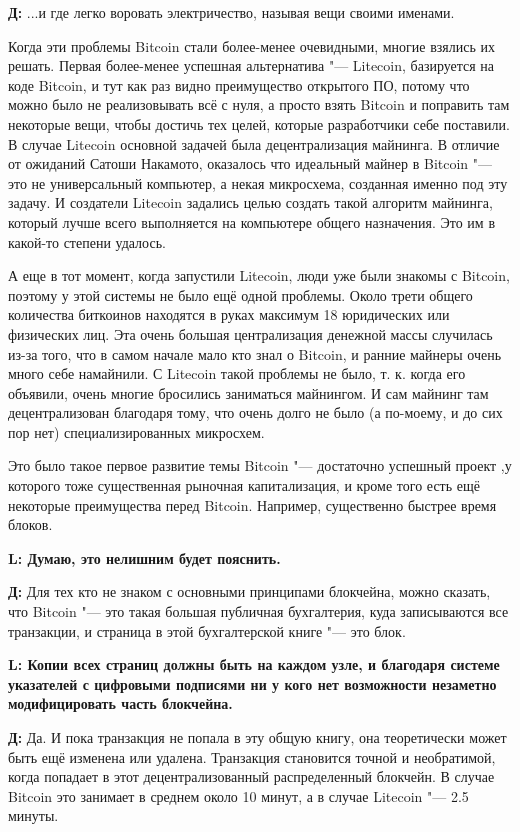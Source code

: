 \documentclass[10pt, a5paper]{article}
\begin{document}
{\noindent \bf Д:} ...и где легко воровать электричество, называя вещи своими именами.

Когда эти проблемы Bitcoin стали более-менее очевидными, многие взялись их решать. Первая более-менее успешная альтернатива "--- Litecoin, базируется на коде Bitcoin, и тут как раз видно преимущество открытого ПО, потому что можно было не реализовывать всё с нуля, а просто взять Bitcoin и поправить там некоторые вещи, чтобы достичь тех целей, которые разработчики себе поставили. В случае Litecoin основной задачей была децентрализация майнинга. В отличие от ожиданий Сатоши Накамото, оказалось что идеальный майнер в Bitcoin "--- это не универсальный компьютер, а некая микросхема, созданная именно под эту задачу. И создатели Litecoin задались целью создать такой алгоритм майнинга, который лучше всего выполняется на компьютере общего назначения. Это им в какой-то степени удалось. 

А еще в тот момент, когда запустили Litecoin, люди уже были знакомы с Bitcoin, поэтому у этой системы не было ещё одной проблемы. Около трети общего количества биткоинов находятся в руках максимум 18 юридических или физических лиц. Эта очень большая централизация денежной массы случилась из-за того, что в самом начале мало кто знал о Bitcoin, и ранние майнеры очень много себе намайнили. С Litecoin такой проблемы не было, т. к. когда его объявили, очень многие бросились заниматься майнингом. И сам майнинг там децентрализован благодаря тому, что очень долго не было (а по-моему, и до сих пор нет) специализированных микросхем. 

Это было такое первое развитие темы Bitcoin "--- достаточно успешный проект ,у которого тоже существенная рыночная капитализация, и кроме того есть ещё некоторые преимущества перед Bitcoin. Например, существенно быстрее время блоков. 


{\noindent \bf L: Думаю, это нелишним будет пояснить.}

{\noindent \bf Д:} Для тех кто не знаком с основными принципами блокчейна, можно сказать, что Bitcoin "--- это такая большая публичная бухгалтерия, куда записываются все транзакции, и страница в этой бухгалтерской книге "--- это блок.

{\noindent \bf L: Копии всех страниц должны быть на каждом узле, и благодаря системе указателей с цифровыми подписями ни у кого нет возможности незаметно модифицировать часть блокчейна.}

{\noindent \bf Д:} Да. И пока транзакция не попала в эту общую книгу, она теоретически может быть ещё изменена или удалена. Транзакция становится точной и необратимой, когда попадает в этот децентрализованный распределенный блокчейн. В случае Bitcoin это занимает в среднем около 10 минут, а в случае Litecoin "--- 2.5 минуты. 
\end{document}
